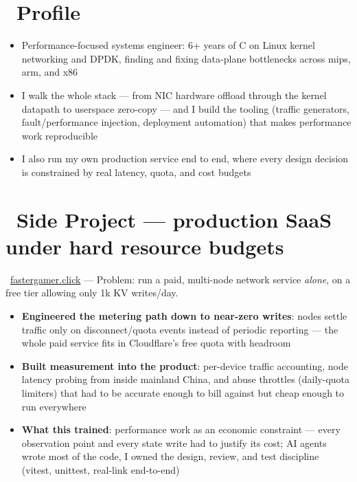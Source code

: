 \documentclass{resume}
\begin{document}



\section{\faRocket\ Profile}
\begin{itemize}[parsep=0.5ex]
	\item Performance-focused systems engineer: 6+ years of C on Linux kernel networking and DPDK, finding and fixing data-plane bottlenecks across mips, arm, and x86
	\item I walk the whole stack --- from NIC hardware offload through the kernel datapath to userspace zero-copy --- and I build the tooling (traffic generators, fault/performance injection, deployment automation) that makes performance work reproducible
	\item I also run my own production service end to end, where every design decision is constrained by real latency, quota, and cost budgets
\end{itemize}

\section{\faLightbulbO\ Side Project --- production SaaS under hard resource budgets}
\begin{onehalfspacing}
\faGlobe\ \href{https://fastergamer.click}{fastergamer.click} ---
Problem: run a paid, multi-node network service \emph{alone}, on a free tier allowing only 1k KV writes/day.
\begin{itemize}
	\item \textbf{Engineered the metering path down to near-zero writes}: nodes settle traffic only on disconnect/quota events instead of periodic reporting --- the whole paid service fits in Cloudflare's free quota with headroom
	\item \textbf{Built measurement into the product}: per-device traffic accounting, node latency probing from inside mainland China, and abuse throttles (daily-quota limiters) that had to be accurate enough to bill against but cheap enough to run everywhere
	\item \textbf{What this trained}: performance work as an economic constraint --- every observation point and every state write had to justify its cost; AI agents wrote most of the code, I owned the design, review, and test discipline (vitest, unittest, real-link end-to-end)
\end{itemize}
\end{onehalfspacing}
\end{document}
